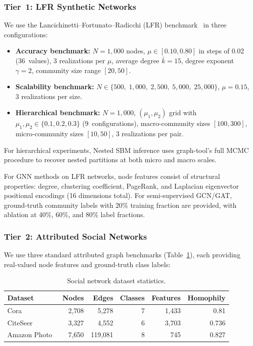 \documentclass[11pt]{article}
\begin{document}
\subsubsection{Tier~1: LFR Synthetic Networks}

We use the Lancichinetti--Fortunato--Radicchi (LFR) benchmark~\citep{andrea_lancichinetti_125b2a5e} in three configurations:

\begin{itemize}[leftmargin=*,nosep]
  \item \textbf{Accuracy benchmark:} $N=1{,}000$ nodes, $\mu \in [0.10, 0.80]$ in steps of 0.02 (36~values), 3 realizations per $\mu$, average degree $\bar{k}=15$, degree exponent $\gamma=2$, community size range $[20, 50]$.
  \item \textbf{Scalability benchmark:} $N \in \{500,\; 1{,}000,\; 2{,}500,\; 5{,}000,\; 25{,}000\}$, $\mu=0.15$, 3 realizations per size.
  \item \textbf{Hierarchical benchmark:} $N=1{,}000$, $(\mu_1, \mu_2)$ grid with $\mu_1, \mu_2 \in \{0.1, 0.2, 0.3\}$ (9~configurations), macro-community sizes $[100, 300]$, micro-community sizes $[10, 50]$, 3 realizations per pair.
\end{itemize}
For hierarchical experiments, Nested SBM inference uses graph-tool's full MCMC procedure to recover nested partitions at both micro and macro scales.

For GNN methods on LFR networks, node features consist of structural properties: degree, clustering coefficient, PageRank, and Laplacian eigenvector positional encodings (16 dimensions total).
For semi-supervised GCN/GAT, ground-truth community labels with 20\% training fraction are provided, with ablation at 40\%, 60\%, and 80\% label fractions.

\subsubsection{Tier~2: Attributed Social Networks}

We use three standard attributed graph benchmarks (Table~\ref{tab:social_datasets}), each providing real-valued node features and ground-truth class labels:

\begin{table}[h]
\centering
\caption{Social network dataset statistics.}
\label{tab:social_datasets}
\small
\begin{tabular}{lrrrrr}
\toprule
\textbf{Dataset} & \textbf{Nodes} & \textbf{Edges} & \textbf{Classes} & \textbf{Features} & \textbf{Homophily} \\
\midrule
Cora~\citep{sen_cora_2008} & 2{,}708 & 5{,}278 & 7 & 1{,}433 & 0.81 \\
CiteSeer~\citep{sen_cora_2008} & 3{,}327 & 4{,}552 & 6 & 3{,}703 & 0.736 \\
Amazon Photo~\citep{shchur_amazon_2018} & 7{,}650 & 119{,}081 & 8 & 745 & 0.827 \\
\bottomrule
\end{tabular}
\end{table}
\end{document}
